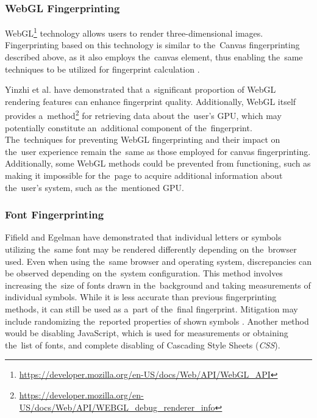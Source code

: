 \subsubsection{WebGL Fingerprinting}


WebGL\footnote{\url{https://developer.mozilla.org/en-US/docs/Web/API/WebGL\_API}} technology allows users to render three-dimensional images. Fingerprinting based on this technology is similar to the~Canvas fingerprinting described above, as it also employs the~canvas element, thus enabling the~same techniques to be utilized for fingerprint calculation \cite{canvas}.

Yinzhi et al.  \cite{webgl-features} have demonstrated that a~significant proportion of WebGL rendering features can enhance fingerprint quality. Additionally, WebGL itself provides a~method\footnote{\url{https://developer.mozilla.org/en-US/docs/Web/API/WEBGL\_debug\_renderer\_info}} for retrieving data about the~user's GPU, which may potentially constitute an~additional component of the~fingerprint. The~techniques for preventing WebGL fingerprinting and their impact on the~user experience remain the~same as those employed for canvas fingerprinting. Additionally, some WebGL methods could be prevented from functioning, such as making it impossible for the~page to acquire additional information about the~user's system, such as the~mentioned GPU.

\subsubsection{Font Fingerprinting}
Fifield and Egelman \cite{font-fingerprint} have demonstrated that individual letters or symbols utilizing the~same font may be rendered differently depending on the~browser used. Even when using the~same browser and operating system, discrepancies can be observed depending on the~system configuration. This method involves increasing the~size of fonts drawn in the~background and taking measurements of individual symbols. While it is less accurate than previous fingerprinting methods, it can still be used as a~part of the~final fingerprint. Mitigation may include randomizing the~reported properties of shown symbols \cite{font-fingerprint}. Another method would be disabling JavaScript, which is used for measurements or obtaining the~list of fonts, and complete disabling of Cascading Style Sheets  (\textit{CSS}).


